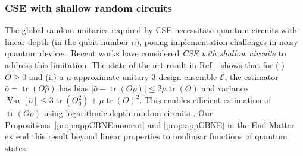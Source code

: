 \documentclass[aps,prl,twocolumn,nofootinbib,superscriptaddress,10pt]{revtex4-2}
\DeclareMathOperator{\Var}{Var}
\DeclareMathOperator{\Tr}{tr}
\theoremstyle{plain}
\theoremstyle{definition}
\begin{document}
\subsubsection{CSE with shallow random circuits}
The global random unitaries required by CSE necessitate quantum circuits with linear depth (in the qubit number \(n\)), posing implementation challenges in noisy quantum devices. Recent works \cite{PhysRevLett.133.020602,Akhtar2023scalableflexible,PhysRevLett.130.230403,schuster2025random} have considered \emph{CSE with shallow circuits} to address this limitation. The state-of-the-art result in Ref.~\cite{schuster2025random} shows that for (i) \(O \geq 0\) and (ii) a \(\mu\)-approximate unitary 3-design ensemble \(\mathcal{E}\), the estimator \(\hat{o} = \Tr(O\hat{\rho})\) has bias \(|\hat{o} - \Tr(O\rho)| \leq 2\mu\Tr(O)\) and variance \(\Var[\hat{o}] \leq 3\Tr(O_0^2) + \mu\Tr(O)^2\). This enables efficient estimation of $\Tr(O\rho)$ using logarithmic-depth random circuits \cite{schuster2025random}. Our Propositions~\ref{prop:appCBNEmoment} and \ref{prop:appCBNE} in the End Matter extend this result beyond linear properties to nonlinear functions  of quantum states.
\end{document}
